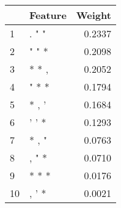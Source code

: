 \begin{tabular}{llr}
\toprule
{} & Feature &  Weight \\
\midrule
1  &   . " " &  0.2337 \\
2  &   " " * &  0.2098 \\
3  &   * * , &  0.2052 \\
4  &   " * * &  0.1794 \\
5  &   * , ' &  0.1684 \\
6  &   ' ' * &  0.1293 \\
7  &   * , " &  0.0763 \\
8  &   , " * &  0.0710 \\
9  &   * * * &  0.0176 \\
10 &   , ' * &  0.0021 \\
\bottomrule
\end{tabular}
